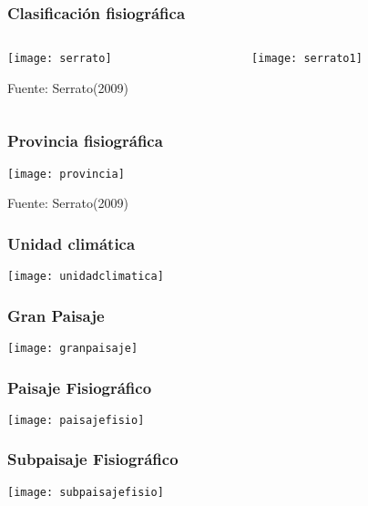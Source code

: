 \documentclass{beamer}
\begin{document}
\begin{frame}
\frametitle{Clasificación fisiográfica}
\begin{columns}
\begin{column}{0.5\textwidth}
\begin{center}
	\texttt{[image: serrato]}
\end{center}
\tiny{Fuente: Serrato(2009)}
\end{column}
\begin{column}{0.5\textwidth}
	\begin{center}
	\texttt{[image: serrato1]}
\end{center}
\end{column}
\end{columns}
\end{frame}
\begin{frame}
\frametitle{Provincia fisiográfica}
\begin{center}
	\texttt{[image: provincia]}
\end{center}
\tiny{Fuente: Serrato(2009)}
\end{frame}
\begin{frame}
\frametitle{Unidad climática}
\begin{center}
	\texttt{[image: unidadclimatica]}
\end{center}
\end{frame}
\begin{frame}
\frametitle{Gran Paisaje}
\begin{center}
	\texttt{[image: granpaisaje]}
\end{center}
\end{frame}
\begin{frame}
\frametitle{Paisaje Fisiográfico}
\begin{center}
	\texttt{[image: paisajefisio]}
\end{center}
\end{frame}
\begin{frame}
\frametitle{Subpaisaje Fisiográfico}
\begin{center}
	\texttt{[image: subpaisajefisio]}
\end{center}
\end{frame}
\end{document}
